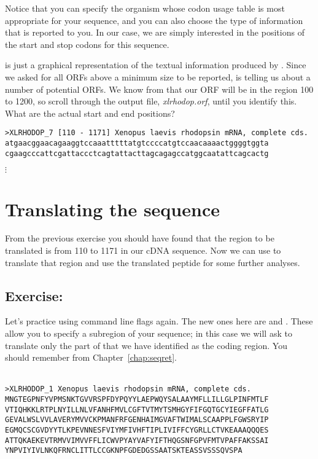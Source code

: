 \documentclass[12pt]{report}
\begin{document}
Notice that you	can specify the	organism whose codon usage table is
most appropriate for your sequence, and	you can	also choose the	type
of information that is reported	to you.	In our case, we	are simply
interested in the positions of the start and stop codons for this
sequence.

 is just a graphical representation of the textual
information produced by	. Since we	asked for all ORFs
above a	minimum	size to	be reported,  is telling us about
a number of potential ORFs. We know from 	that our ORF
will be	in the region 100 to 1200, so scroll through the output	file,
{\em xlrhodop.orf}, until you identify this. What are the actual start
and end	positions?

\unix{}
\begin{verbatim}
>XLRHODOP_7 [110 - 1171] Xenopus laevis	rhodopsin mRNA,	complete cds.
atgaacggaacagaaggtccaaatttttatgtccccatgtccaacaaaactggggtggta
cgaagcccattcgattaccctcagtattacttagcagagccatggcaatattcagcactg
\end{verbatim}
$\vdots$

\section{Translating the sequence}

From the previous exercise you should have found that the region to be
translated is from 110 to 1171 in our cDNA sequence. Now we can	use
	to translate that region and use the translated
peptide	for some further analyses.

\subsection*{Exercise: }

Let's practice using command line flags	again. The new ones here are
 and . These allow you to specify a
subregion of your sequence; in this case we will ask
 to translate only the part of
 that we have identified as	the coding
region.	You should remember  from
Chapter~\ref{chap:seqret}.\\

\unix{}\\

\unix{}
\begin{verbatim}
>XLRHODOP_1 Xenopus laevis rhodopsin mRNA, complete cds.
MNGTEGPNFYVPMSNKTGVVRSPFDYPQYYLAEPWQYSALAAYMFLLILLGLPINFMTLF
VTIQHKKLRTPLNYILLNLVFANHFMVLCGFTVTMYTSMHGYFIFGQTGCYIEGFFATLG
GEVALWSLVVLAVERYMVVCKPMANFRFGENHAIMGVAFTWIMALSCAAPPLFGWSRYIP
EGMQCSCGVDYYTLKPEVNNESFVIYMFIVHFTIPLIVIFFCYGRLLCTVKEAAAQQQES
ATTQKAEKEVTRMVVIMVVFFLICWVPYAYVAFYIFTHQGSNFGPVFMTVPAFFAKSSAI
YNPVIYIVLNKQFRNCLITTLCCGKNPFGDEDGSSAATSKTEASSVSSSQVSPA
\end{verbatim}
\end{document}
